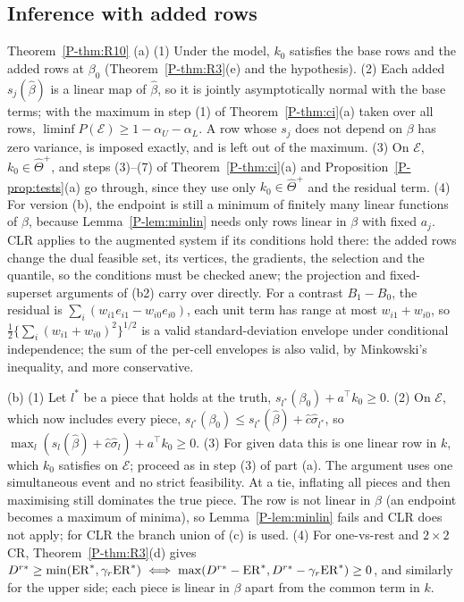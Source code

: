 \subsection{Inference with added rows}

\begin{proofof}{Theorem~\ref{P-thm:R10}}
(a) (1) Under the model, $k_0$ satisfies the base rows and the added rows at $\beta_0$
(Theorem~\ref{P-thm:R3}(e) and the hypothesis). (2) Each added $s_j(\hat\beta)$ is a linear
map of $\hat\beta$, so it is jointly asymptotically normal with the base terms; with the
maximum in step (1) of Theorem~\ref{P-thm:ci}(a) taken over all rows,
$\liminf P(\mathcal E)\ge1-\alpha_U-\alpha_L$. A row whose $s_j$ does not depend on $\beta$
has zero variance, is imposed exactly, and is left out of the maximum. (3) On $\mathcal E$,
$k_0\in\hat\Theta^+$, and steps (3)--(7) of Theorem~\ref{P-thm:ci}(a) and
Proposition~\ref{P-prop:tests}(a) go through, since they use only $k_0\in\hat\Theta^+$ and
the residual term. (4) For version (b), the endpoint is still a minimum of finitely
many linear functions of $\beta$, because Lemma~\ref{P-lem:minlin} needs only rows linear
in $\beta$ with fixed $a_j$. CLR applies to the augmented system if its conditions hold
there: the added rows change the dual feasible set, its vertices, the gradients, the
selection and the quantile, so the conditions must be checked anew; the projection and
fixed-superset arguments of (b2) carry over directly. For a contrast $B_1-B_0$, the
residual is $\sum_i(w_{i1}e_{i1}-w_{i0}e_{i0})$, each unit term has range at most
$w_{i1}+w_{i0}$, so $\tfrac12\{\sum_i(w_{i1}+w_{i0})^2\}^{1/2}$ is a valid standard-deviation
envelope under conditional independence; the sum of the per-cell envelopes is also
valid, by Minkowski's inequality, and more conservative.

(b) (1) Let $l^*$ be a piece that holds at the truth, $s_{l^*}(\beta_0)+a^\top k_0\ge0$.
(2) On $\mathcal E$, which now includes every piece,
$s_{l^*}(\beta_0)\le s_{l^*}(\hat\beta)+\hat c\hat\sigma_{l^*}$, so
$\max_l(s_l(\hat\beta)+\hat c\hat\sigma_l)+a^\top k_0\ge0$. (3) For given data this is one
linear row in $k$, which $k_0$ satisfies on $\mathcal E$; proceed as in step (3) of part (a). The argument
uses one simultaneous event and no strict feasibility. At a tie, inflating all pieces
and then maximising still dominates the true piece. The row is not linear in $\beta$
(an endpoint becomes a maximum of minima), so Lemma~\ref{P-lem:minlin} fails and CLR does
not apply; for CLR the branch union of (c) is used. (4) For one-vs-rest and $2\times2$
CR, Theorem~\ref{P-thm:R3}(d) gives
$D^{r*}\ge\min(\mathrm{ER}^*,\gamma_r\mathrm{ER}^*)\iff\max(D^{r*}-\mathrm{ER}^*,D^{r*}-\gamma_r\mathrm{ER}^*)\ge0$, and
similarly for the upper side; each piece is linear in $\beta$ apart from the common
term in $k$.


\end{proofof}
